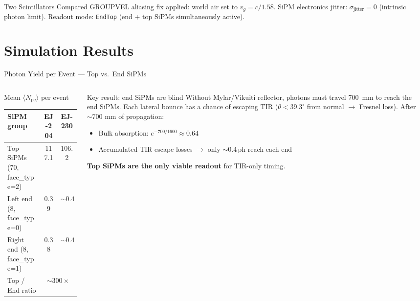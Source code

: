 \documentclass[aspectratio=169,10pt]{beamer}
\begin{document}
\begin{frame}{Two Scintillators Compared}
\vspace{0.3em}
{\footnotesize
GROUPVEL aliasing fix applied: world air set to $v_g = c/1.58$.
SiPM electronics jitter: $\sigma_\text{jitter}=0$ (intrinsic photon limit).
Readout mode: \texttt{EndTop} (end + top SiPMs simultaneously active).
}

\end{frame}

\section{Simulation Results}

\begin{frame}{Photon Yield per Event --- Top vs.\ End SiPMs}

\begin{columns}[T]

  \begin{column}{0.52\textwidth}
  \begin{block}{Mean $\langle N_\text{pe}\rangle$ per event}
  \renewcommand{\arraystretch}{1.3}
  \begin{tabular}{@{}lSS@{}}
    \toprule
    SiPM group & {\textbf{EJ-204}} & {\textbf{EJ-230}} \\
    \midrule
    Top SiPMs (70, face\_type=2)  & 117.1 & 106.2 \\
    Left end (8, face\_type=0)    & 0.39  & {$\sim\!0.4$} \\
    Right end (8, face\_type=1)   & 0.38  & {$\sim\!0.4$} \\
    \midrule
    Top / End ratio &  \\
    \bottomrule
  \end{tabular}
  \end{block}
  \end{column}

  \begin{column}{0.46\textwidth}
  \begin{alertblock}{Key result: end SiPMs are blind}
  \small
  Without Mylar/Vikuiti reflector, photons must travel \SI{700}{mm}
  to reach the end SiPMs.
  Each lateral bounce has a chance of escaping TIR ($\theta < 39.3^\circ$
  from normal $\to$ Fresnel loss).
  After $\sim\!700$ mm of propagation:
  \begin{itemize}\setlength\itemsep{0.1em}
    \item Bulk absorption: $e^{-700/1600} \approx 0.64$
    \item Accumulated TIR escape losses $\to$ only $\sim\!0.4$\,ph reach each end
  \end{itemize}
  \textbf{Top SiPMs are the only viable readout} for TIR-only timing.
  \end{alertblock}
  \end{column}
\end{columns}


\end{frame}
\end{document}
